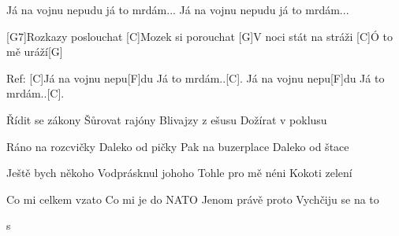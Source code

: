 
Já na vojnu nepudu
já to mrdám...
Já na vojnu nepudu
já to mrdám...

[G7]Rozkazy poslouchat
[C]Mozek si porouchat
[G]V noci stát na stráži
[C]\null Ó to mě uráží[G]

Ref:
[C]Já na vojnu nepu[F]du
Já to mrdám..[C].
Já na vojnu nepu[F]du
Já to mrdám..[C].

\begin{multicols}{2}
	
	Řídit se zákony
	Šůrovat rajóny
	Blivajzy z ešusu
	Dožírat v poklusu
	
	Ráno na rozcvičky
	Daleko od pičky
	Pak na buzerplace
	Daleko od štace
	\slpc
	
	Ještě bych někoho
	Vodprásknul johoho
	Tohle pro mě néni
	Kokoti zelení
	
	Co mi celkem vzato 
	Co mi je do NATO
	Jenom právě proto
	Vychčiju se na to \vfill
	
\end{multicols}s